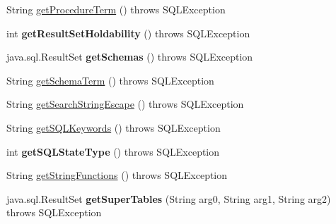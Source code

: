 \begin{DoxyCompactItemize}
String \mbox{\hyperlink{classcom_1_1mysql_1_1cj_1_1jdbc_1_1_database_meta_data_ab923813917b7a71a24c5b3067d467694}{get\+Procedure\+Term}} ()  throws S\+Q\+L\+Exception 
\item 
\mbox{\label{classcom_1_1mysql_1_1cj_1_1jdbc_1_1_database_meta_data_adf86d6bb0db14b9abb64497d8b14b743}} 
int {\bfseries get\+Result\+Set\+Holdability} ()  throws S\+Q\+L\+Exception 
\item 
\mbox{\label{classcom_1_1mysql_1_1cj_1_1jdbc_1_1_database_meta_data_a5826cd5b83c15ae364cbc577f78895d1}} 
java.\+sql.\+Result\+Set {\bfseries get\+Schemas} ()  throws S\+Q\+L\+Exception 
\item 
String \mbox{\hyperlink{classcom_1_1mysql_1_1cj_1_1jdbc_1_1_database_meta_data_a694df26784a27fb9bf57e3b94e16878b}{get\+Schema\+Term}} ()  throws S\+Q\+L\+Exception 
\item 
String \mbox{\hyperlink{classcom_1_1mysql_1_1cj_1_1jdbc_1_1_database_meta_data_ae340a42fa7071bbc701cb74bec470c7b}{get\+Search\+String\+Escape}} ()  throws S\+Q\+L\+Exception 
\item 
String \mbox{\hyperlink{classcom_1_1mysql_1_1cj_1_1jdbc_1_1_database_meta_data_aab2c54d10e91a54ade1420ba242372fd}{get\+S\+Q\+L\+Keywords}} ()  throws S\+Q\+L\+Exception 
\item 
\mbox{\label{classcom_1_1mysql_1_1cj_1_1jdbc_1_1_database_meta_data_a161502700c7b83b4213afbba31d7a2f6}} 
int {\bfseries get\+S\+Q\+L\+State\+Type} ()  throws S\+Q\+L\+Exception 
\item 
String \mbox{\hyperlink{classcom_1_1mysql_1_1cj_1_1jdbc_1_1_database_meta_data_a3979e65b1b046ec65231cc83b8481ab5}{get\+String\+Functions}} ()  throws S\+Q\+L\+Exception 
\item 
\mbox{\label{classcom_1_1mysql_1_1cj_1_1jdbc_1_1_database_meta_data_a6f3cf5ca5844df1c5f7f0f514bfe2bed}} 
java.\+sql.\+Result\+Set {\bfseries get\+Super\+Tables} (String arg0, String arg1, String arg2)  throws S\+Q\+L\+Exception 
\item 
\mbox{\label{classcom_1_1mysql_1_1cj_1_1jdbc_1_1_database_meta_data_a2eec314ca7b01a8252333995f2df109d}} 

\end{DoxyCompactItemize}
